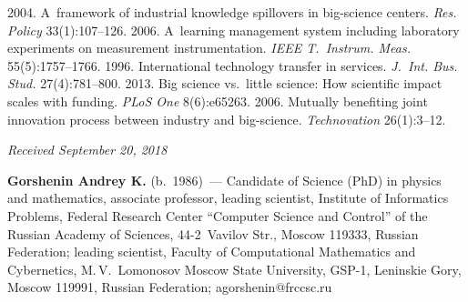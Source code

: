 \begin{multicols}{2}
{{\begin{thebibliography}{99}
 2004. 
A~framework of industrial knowledge spillovers in big-science centers. 
\textit{Res. Policy} 33(1):107--126.
 2006. 
A~learning management system including laboratory experiments on measurement 
instrumentation. \textit{IEEE T.~Instrum. Meas.} 55(5):1757--1766.
 1996. International technology transfer in services. 
\textit{J.~Int. Bus. Stud.} 27(4):781--800.
 2013. 
Big science vs.\ little science: How scientific impact scales with funding. 
\textit{PLoS One} 8(6):e65263.
 2006. 
Mutually benefiting joint innovation process between industry and big-science. 
\textit{Technovation} 26(1):3--12.
\end{thebibliography}

 }
 }

\end{multicols}

\vspace*{-6pt}

\hfill{\small\textit{Received September 20, 2018}}



\Contrl

\noindent
\textbf{Gorshenin Andrey K.} (b.\ 1986)~--- Candidate of Science (PhD) in physics and
mathematics, associate professor, leading scientist, Institute of Informatics Problems,
Federal Research Center ``Computer Science and Control'' of the Russian Academy of
Sciences, 44-2~Vavilov Str., Moscow 119333, Russian Federation;  
leading scientist, Faculty
of Computational Mathematics and Cybernetics, M.\,V.~Lomonosov Moscow State 
University, GSP-1, Leninskie Gory, Moscow 119991, 
Russian Federation; \mbox{agorshenin@frccsc.ru}
\label{end\stat}

\renewcommand{\bibname}{\protect\rm Литература}       